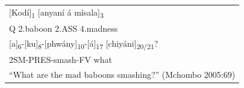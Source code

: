 \begin{tabular}{@{}l@{}}
\Large [Kodí]\textsubscript{1} [anyaní á mísala]\textsubscript{3} \\[4pt]
\large Q 2.baboon 2.ASS 4.madness \\[12pt]
\Large [a]\textsubscript{6}-[ku]\textsubscript{8}-[phwány]\textsubscript{10}-[á]\textsubscript{17} [chiyáni]\textsubscript{20/21}? \\[4pt]
\large 2SM-PRES-smash-FV what \\[12pt]
\parbox[t]{236.00362pt}{\raggedright\Large ``What are the mad baboons smashing?'' (Mchombo 2005:69)} \\
\end{tabular}

